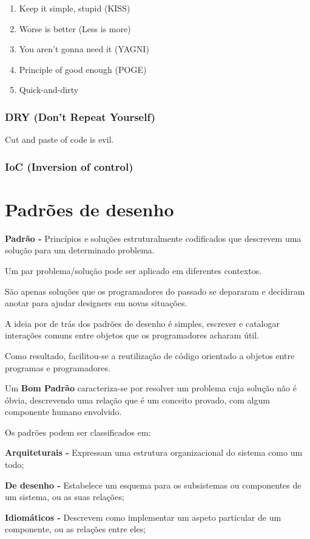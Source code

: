 \documentclass{article}
\begin{document}
\begin{enumerate}
    \item Keep it simple, stupid (KISS)
    \item Worse is better (Less is more)
    \item You aren't gonna need it (YAGNI)
    \item Principle of good enough (POGE)
    \item Quick-and-dirty
\end{enumerate}

\subsubsection{DRY (Don’t Repeat Yourself)}

Cut and paste of code is evil.

\subsubsection{IoC (Inversion of control)}

\vspace{3mm}
\section{Padrões de desenho}

\begin{flushleft}
    \textbf{Padrão -} Princípios e soluções estruturalmente codificados que descrevem uma
    solução para um determinado problema.

    Um par problema/solução pode ser aplicado em diferentes contextos.

    São apenas soluções que os programadores do passado se depararam e decidiram anotar
    para ajudar designers em novas situações.

    A ideia por de trás dos padrões de desenho é simples, escrever e catalogar interações
    comuns entre objetos que os programadores acharam útil.

    Como resultado, facilitou-se a reutilização de código orientado a objetos entre programas e
    programadores.
\end{flushleft}

Um \textbf{Bom Padrão} caracteriza-se por resolver um problema cuja solução não é óbvia,
descrevendo uma relação que é um conceito provado, com algum componente
humano envolvido.

\begin{flushleft}
    Os padrões podem ser classificados em:

    \vspace{3mm}
    \textbf{Arquiteturais -} Expressam uma estrutura organizacional do sistema
    como um todo;

    \textbf{De desenho -} Estabelece um esquema para os subsistemas ou
    componentes de um sistema, ou as suas relações;

    \textbf{Idiomáticos -} Descrevem como implementar um aspeto particular de um
    componente, ou as relações entre eles;
\end{flushleft}
\end{document}
